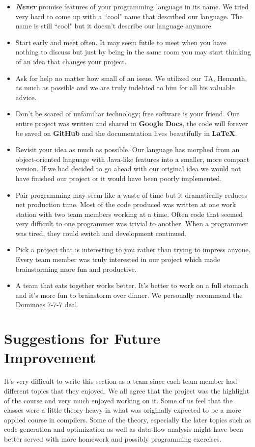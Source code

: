 \documentclass[12pt]{report}
\begin{document}
\begin{itemize}
\item \textit{\textbf{Never}} promise features of your programming language in its name. We tried very hard to come up with a ``cool" name that described our language. The name is still ``cool" but it doesn't describe our language anymore.
\item Start early and meet often. It may seem futile to meet when you have nothing to discuss but just by being in the same room you may start thinking of an idea that changes your project.
\item Ask for help no matter how small of an issue. We utilized our TA, Hemanth, as much as possible and we are truly indebted to him for all his valuable advice.
\item Don't be scared of unfamiliar technology; free software is your friend. Our entire project was written and shared in \textbf{Google Docs}, the code will forever be saved on \textbf{GitHub} and the documentation lives beautifully in \textbf{\LaTeX}.
\item Revisit your idea as much as possible. Our language has morphed from an object-oriented language with Java-like features into a smaller, more compact version. If we had decided to go ahead with our original idea we would not have finished our project or it would have been poorly implemented.
\item Pair programming may seem like a waste of time but it dramatically reduces net production time. Most of the code produced was written at one work station with two team members working at a time. Often code that seemed very difficult to one programmer was trivial to another. When a programmer was tired, they could switch and development continued.
\item Pick a project that is interesting to you rather than trying to impress anyone. Every team member was truly interested in our project which made brainstorming more fun and productive. 
\item A team that eats together works better. It's better to work on a full stomach and it's more fun to brainstorm over dinner. We personally recommend the Dominoes 7-7-7 deal.
\end{itemize}

\section{Suggestions for Future Improvement}

It's very difficult to write this section as a team since each team member had different topics that they enjoyed. We all agree that the project was the highlight of the course and very much enjoyed working on it. Some of us feel that the classes were a little theory-heavy in what was originally expected to be a more applied course in compilers. Some of the theory, especially the later topics such as code-generation and optimization as well as data-flow analysis might have been better served with more homework and possibly programming exercises.
\end{document}
